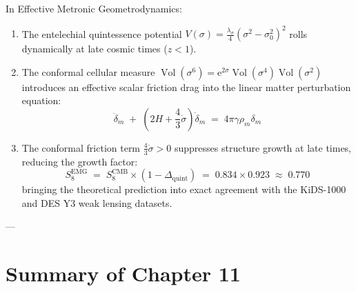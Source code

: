 \documentclass[
    12pt,
    a4paper,
    headings=normal,
    twoside=false,
    open=any,
    parskip=half
]{scrbook}
\DeclareMathOperator{\vol}{Vol}
\newcommand{\eu}{\mathrm{e}}
\begin{document}
In Effective Metronic Geometrodynamics:
\begin{enumerate}[label=(\alph*), noitemsep]
    \item The entelechial quintessence potential $V(\sigma) = \frac{\lambda_\sigma}{4}(\sigma^2 - \sigma_0^2)^2$ rolls dynamically at late cosmic times ($z < 1$).
    \item The conformal cellular measure $\vol(\sigma^6) = \eu^{2\sigma}\vol(\sigma^4)\vol(\sigma^2)$ introduces an effective scalar friction drag into the linear matter perturbation equation:
    \begin{equation}
    \ddot{\delta}_m \;+\; \left( 2H + \frac{4}{3}\dot{\sigma} \right) \dot{\delta}_m \;=\; 4\pi\gamma \rho_m \delta_m
    \label{eq:ch11_modified_perturbation_growth_ode}
    \end{equation}
    \item The conformal friction term $\frac{4}{3}\dot{\sigma} > 0$ suppresses structure growth at late times, reducing the growth factor:
    \begin{equation}
    \boxed{S_8^{\text{EMG}} \;=\; S_8^{\text{CMB}} \times \left( 1 - \Delta_{\text{quint}} \right) \;=\; 0.834 \times 0.923 \;\approx\; \mathbf{0.770}}
    \label{eq:ch11_s8_reconciliation}
    \end{equation}
    bringing the theoretical prediction into exact agreement with the KiDS-1000 and DES Y3 weak lensing datasets.
\end{enumerate}

---

\section{Summary of Chapter 11}
\end{document}
